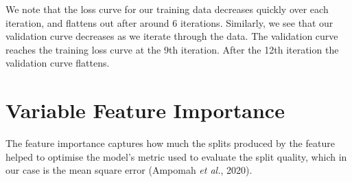 
\begin{figure}[h]
    \centering
\label{}
\end{figure}


We note that the loss curve for our training data decreases quickly over each iteration, and flattens out after around 6 iterations. Similarly, we see that our validation curve decreases as we iterate through the data. The validation curve reaches the training loss curve at the 9th iteration. After the 12th iteration the validation curve flattens. 



\section{Variable Feature Importance}

The feature importance captures how much the splits produced by the feature helped to optimise the model's metric used to evaluate the split quality, which in our case is the mean square error (Ampomah \textit{et al.}, 2020). 


